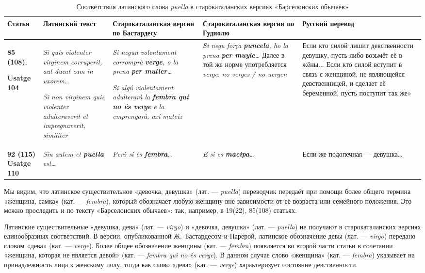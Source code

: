 \begin{center}
\small
\setlength{\tabcolsep}{2pt}
\begin{longtable}{|p{}|p{}|p{}|p{}|p{}|}
\caption{Соответствия латинского слова \emph{puella} в старокаталанских версиях «Барселонских обычаев»}\label{tab:ch2-puella}\\
\hline
\textbf{Статья} & \textbf{Латинский текст} & \textbf{Старокаталанская версия по Бастардесу} & \textbf{Старокаталанская версия по Гудиолю} & \textbf{Русский перевод} \\ \hline
\textbf{85 (108)},\par \textbf{Usatge 104} & \emph{Si quis violenter virginem corruperit, aut ducat eam in uxorem… }\par \emph{Si non virginem quis violenter adulteraverit et impregnaverit, similiter} & \emph{Si negun volentament corromprà }\textbf{\emph{verge}}\emph{, o la prena }\textbf{\emph{per muller}}\emph{… }\par \emph{Si algú violentament adulterarà la }\textbf{\emph{fembra qui no és verge}}\emph{ e la emprenyarà, axí mateix} & \emph{Si negu força }\textbf{\emph{puncela}}\emph{, ho la prena }\textbf{\emph{per muyle}}\emph{…} Далее в той же норме употребляется \emph{verge}: \emph{no verges / no uergen} & Если кто силой лишит девственности девушку, пусть либо возьмёт её в жёны... Если кто силой вступит в связь с женщиной, не являющейся девственницей, и сделает её беременной, пусть поступит так же» \\ \hline
\textbf{92 (115)} \textbf{Usatge 110} & \emph{Sin autem et }\textbf{\emph{puella}}\emph{ est…} & \emph{Però si és }\textbf{\emph{fembra}}\emph{…} & \emph{E si es }\textbf{\emph{macipa}}\emph{…} & Если же подопечная --- девушка… \\ \hline
\end{longtable}
\end{center}

Мы видим, что латинское существительное «девочка, девушка» (лат. --- \emph{puella}) переводчик передаёт при помощи более общего термина «женщина, самка» (кат. --- \emph{fembra}), который обозначает любую женщину вне зависимости от её возраста или семейного положения. Это можно проследить и по тексту «Барселонских обычаев»: так, например, в 19(22), 85(108) статьях.

Латинские существительные «девушка, дева» (лат. --- \emph{virgo}) и «девочка, девушка» (лат. --- \emph{puella}) не получают в старокаталанских версиях единообразных соответствий. В версии, опубликованной Ж.~Бастардесом-и-Парерой, латинское обозначение девы (лат. --- \emph{virgo}) передано словом «дева» (кат. --- \emph{verge}). Более общее обозначение женщины (кат. --- \emph{fembra}) появляется во второй части статьи в сочетании «женщина, которая не является девой» (кат. --- \emph{fembra qui no és verge}). В данном случае слово «женщина» (кат. --- \emph{fembra}) указывает на принадлежность лица к женскому полу, тогда как слово «дева» (кат. --- \emph{verge}) характеризует состояние девственности.


